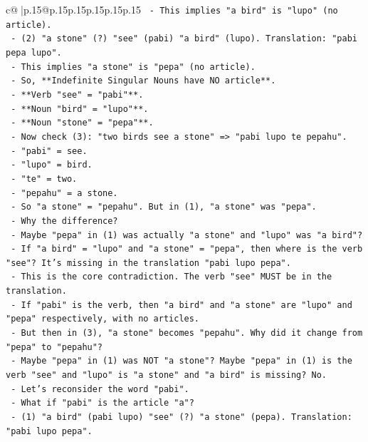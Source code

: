 \documentclass{article}
\begin{document}
{\begin{supertabular}{c@{$\;$}|p{.15\linewidth}@{}p{.15\linewidth}p{.15\linewidth}p{.15\linewidth}p{.15\linewidth}p{.15\linewidth}}
{{{\texttt{      {-} This implies "a bird" is "lupo" (no article).} \\
\texttt{      {-} (2) "a stone" (?) "see" (pabi) "a bird" (lupo). Translation: "pabi pepa lupo".} \\
\texttt{      {-} This implies "a stone" is "pepa" (no article).} \\
\texttt{      {-} So, **Indefinite Singular Nouns have NO article**.} \\
\texttt{      {-} **Verb "see" = "pabi"**.} \\
\texttt{      {-} **Noun "bird" = "lupo"**.} \\
\texttt{      {-} **Noun "stone" = "pepa"**.} \\
\texttt{      {-} Now check (3): "two birds see a stone" => "pabi lupo te pepahu".} \\
\texttt{        {-} "pabi" = see.} \\
\texttt{        {-} "lupo" = bird.} \\
\texttt{        {-} "te" = two.} \\
\texttt{        {-} "pepahu" = a stone.} \\
\texttt{        {-} So "a stone" = "pepahu". But in (1), "a stone" was "pepa".} \\
\texttt{        {-} Why the difference?} \\
\texttt{        {-} Maybe "pepa" in (1) was actually "a stone" and "lupo" was "a bird"?} \\
\texttt{        {-} If "a bird" = "lupo" and "a stone" = "pepa", then where is the verb "see"? It's missing in the translation "pabi lupo pepa".} \\
\texttt{        {-} This is the core contradiction. The verb "see" MUST be in the translation.} \\
\texttt{        {-} If "pabi" is the verb, then "a bird" and "a stone" are "lupo" and "pepa" respectively, with no articles.} \\
\texttt{        {-} But then in (3), "a stone" becomes "pepahu". Why did it change from "pepa" to "pepahu"?} \\
\texttt{        {-} Maybe "pepa" in (1) was NOT "a stone"? Maybe "pepa" in (1) is the verb "see" and "lupo" is "a stone" and "a bird" is missing? No.} \\
\texttt{        {-} Let's reconsider the word "pabi".} \\
\texttt{        {-} What if "pabi" is the article "a"?} \\
\texttt{          {-} (1) "a bird" (pabi lupo) "see" (?) "a stone" (pepa). Translation: "pabi lupo pepa".} \\
}}}
\end{supertabular}}
\end{document}
